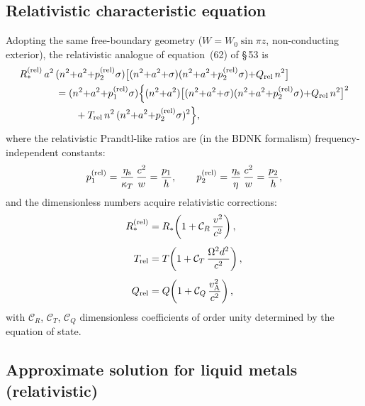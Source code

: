 \subsection{Relativistic characteristic equation}

Adopting the same free-boundary geometry ($W = W_0\sin\pi z$, non-conducting
exterior), the relativistic analogue of equation~(62) of \S\,53 is
\begin{align}
  R_*^{(\mathrm{rel})}\,a^{2}\,&(n^{2}{+}a^{2}{+}p_{2}^{(\mathrm{rel})}\sigma)
  \bigl[(n^{2}{+}a^{2}{+}\sigma)(n^{2}{+}a^{2}{+}p_{2}^{(\mathrm{rel})}\sigma)
  {+}Q_{\mathrm{rel}}\,n^{2}\bigr]
  \notag\\
  &= (n^{2}{+}a^{2}{+}p_{1}^{(\mathrm{rel})}\sigma)
  \Bigl\{(n^{2}{+}a^{2})
  \bigl[(n^{2}{+}a^{2}{+}\sigma)(n^{2}{+}a^{2}{+}p_{2}^{(\mathrm{rel})}\sigma)
  {+}Q_{\mathrm{rel}}\,n^{2}\bigr]^{2}
  \notag\\
  &\qquad {}+ T_{\mathrm{rel}}\,n^{2}\,(n^{2}{+}a^{2}{+}p_{2}^{(\mathrm{rel})}\sigma)^{2}
  \Bigr\},
  \label{eq:rel53-chareq}
\end{align}
where the relativistic Prandtl-like ratios are (in the BDNK formalism)
frequency-independent constants:
\begin{equation}
  p_{1}^{(\mathrm{rel})} = \frac{\eta_{\mathrm{s}}}{\kappa_T}\,
  \frac{c^{2}}{w} = \frac{p_1}{h},\qquad
  p_{2}^{(\mathrm{rel})} = \frac{\eta_{\mathrm{s}}}{\eta}\,
  \frac{c^{2}}{w} = \frac{p_2}{h},
  \label{eq:rel53-prel}
\end{equation}
and the dimensionless numbers acquire relativistic corrections:
\begin{align}
  R_*^{(\mathrm{rel})} &= R_*\!\left(1 + \mathcal{C}_R\,\frac{v^{2}}{c^{2}}\right),
  \label{eq:rel53-Rrel}\\[4pt]
  T_{\mathrm{rel}} &= T\!\left(1 + \mathcal{C}_T\,\frac{\Omega^{2}d^{2}}{c^{2}}\right),
  \label{eq:rel53-Trel}\\[4pt]
  Q_{\mathrm{rel}} &= Q\!\left(1 + \mathcal{C}_Q\,\frac{v_{\mathrm{A}}^{2}}{c^{2}}\right),
  \label{eq:rel53-Qrel}
\end{align}
with $\mathcal{C}_R$, $\mathcal{C}_T$, $\mathcal{C}_Q$ dimensionless
coefficients of order unity determined by the equation of state.

\subsection{Approximate solution for liquid metals (relativistic)}\label{subsec:rel53-approx}

